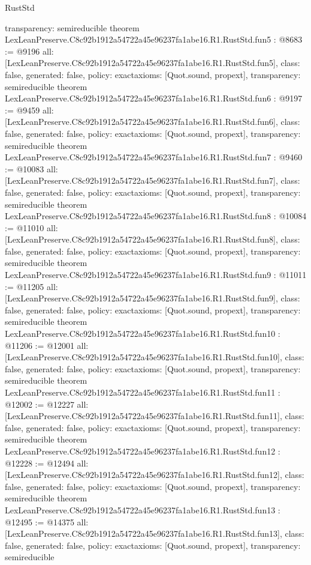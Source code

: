 \begin{lexlean}{RustStd}
\begin{coremodule}
{  transparency: semireducible
}
theorem LexLeanPreserve.C8c92b1912a54722a45e96237fa1abe16.R1.RustStd.fun5 : @8683 := @9196 {
  all: [LexLeanPreserve.C8c92b1912a54722a45e96237fa1abe16.R1.RustStd.fun5],
  class: false,
  generated: false,
  policy: exact{axioms: [Quot.sound, propext]},
  transparency: semireducible
}
theorem LexLeanPreserve.C8c92b1912a54722a45e96237fa1abe16.R1.RustStd.fun6 : @9197 := @9459 {
  all: [LexLeanPreserve.C8c92b1912a54722a45e96237fa1abe16.R1.RustStd.fun6],
  class: false,
  generated: false,
  policy: exact{axioms: [Quot.sound, propext]},
  transparency: semireducible
}
theorem LexLeanPreserve.C8c92b1912a54722a45e96237fa1abe16.R1.RustStd.fun7 : @9460 := @10083 {
  all: [LexLeanPreserve.C8c92b1912a54722a45e96237fa1abe16.R1.RustStd.fun7],
  class: false,
  generated: false,
  policy: exact{axioms: [Quot.sound, propext]},
  transparency: semireducible
}
theorem LexLeanPreserve.C8c92b1912a54722a45e96237fa1abe16.R1.RustStd.fun8 : @10084 := @11010 {
  all: [LexLeanPreserve.C8c92b1912a54722a45e96237fa1abe16.R1.RustStd.fun8],
  class: false,
  generated: false,
  policy: exact{axioms: [Quot.sound, propext]},
  transparency: semireducible
}
theorem LexLeanPreserve.C8c92b1912a54722a45e96237fa1abe16.R1.RustStd.fun9 : @11011 := @11205 {
  all: [LexLeanPreserve.C8c92b1912a54722a45e96237fa1abe16.R1.RustStd.fun9],
  class: false,
  generated: false,
  policy: exact{axioms: [Quot.sound, propext]},
  transparency: semireducible
}
theorem LexLeanPreserve.C8c92b1912a54722a45e96237fa1abe16.R1.RustStd.fun10 : @11206 := @12001 {
  all: [LexLeanPreserve.C8c92b1912a54722a45e96237fa1abe16.R1.RustStd.fun10],
  class: false,
  generated: false,
  policy: exact{axioms: [Quot.sound, propext]},
  transparency: semireducible
}
theorem LexLeanPreserve.C8c92b1912a54722a45e96237fa1abe16.R1.RustStd.fun11 : @12002 := @12227 {
  all: [LexLeanPreserve.C8c92b1912a54722a45e96237fa1abe16.R1.RustStd.fun11],
  class: false,
  generated: false,
  policy: exact{axioms: [Quot.sound, propext]},
  transparency: semireducible
}
theorem LexLeanPreserve.C8c92b1912a54722a45e96237fa1abe16.R1.RustStd.fun12 : @12228 := @12494 {
  all: [LexLeanPreserve.C8c92b1912a54722a45e96237fa1abe16.R1.RustStd.fun12],
  class: false,
  generated: false,
  policy: exact{axioms: [Quot.sound, propext]},
  transparency: semireducible
}
theorem LexLeanPreserve.C8c92b1912a54722a45e96237fa1abe16.R1.RustStd.fun13 : @12495 := @14375 {
  all: [LexLeanPreserve.C8c92b1912a54722a45e96237fa1abe16.R1.RustStd.fun13],
  class: false,
  generated: false,
  policy: exact{axioms: [Quot.sound, propext]},
  transparency: semireducible
}
\end{coremodule}
\end{lexlean}
